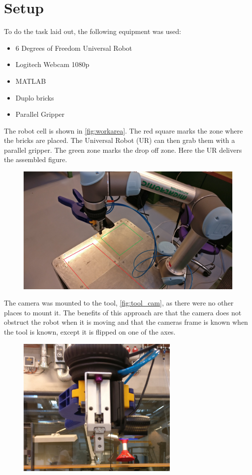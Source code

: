 \chapter{Setup}
To do the task laid out, the following equipment was used:

\begin{itemize}
\item 6 Degrees of Freedom Universal Robot
\item Logitech Webcam 1080p
\item MATLAB
\item \lego Duplo bricks
\item Parallel Gripper
\end{itemize}

The robot cell is shown in \autoref{fig:workarea}. The red square marks the zone where the bricks are placed. The Universal Robot (UR) can then grab them with a parallel gripper. The green zone marks the drop off zone. Here the UR delivers the assembled figure.

\begin{figure}[h]
\centering
\includegraphics[width=\textwidth]{figures/workarea.jpg}
\caption{}
\label{fig:workarea}
\end{figure}

The camera was mounted to the tool, \autoref{fig:tool_cam}, as there were no other places to mount it. The benefits of this approach are that the camera does not obstruct the robot when it is moving and that the cameras frame is known when the tool is known, except it is flipped on one of the axes.

\begin{figure}[h]
\centering
\includegraphics[width=0.7\textwidth]{figures/tool_cam.jpg}
\caption{}
\label{fig:tool_cam}
\end{figure}